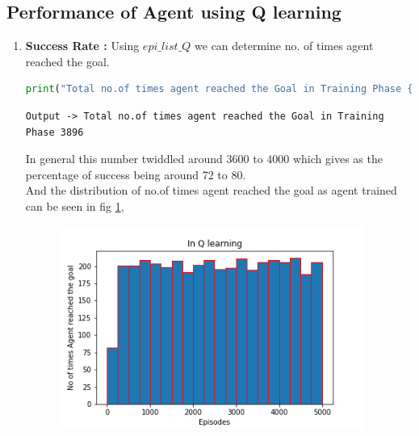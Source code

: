 \documentclass[journal,12pt,onecolumn]{IEEEtran}
\theoremstyle{remark}
\numberwithin{equation}{section}
\begin{document}
\subsection{Performance of Agent using Q learning}
 \begin{enumerate}
   \item \textbf{Success Rate :} Using $epi\_list\_Q$ we can determine no. of times agent reached the goal. 
 \begin{lstlisting}[language = Python]
print("Total no.of times agent reached the Goal in Training Phase {}".format(len(epi_list_Q)))
            \end{lstlisting}
            \begin{lstlisting}
Output -> Total no.of times agent reached the Goal in Training Phase 3896
            \end{lstlisting}
        In general this number twiddled around $3600$ to $4000$ which gives as the percentage of success being around 72 to 80.\\
	And the distribution of no.of times agent reached the goal as agent trained can be seen in fig \ref{epi-suc-Q},
	\begin{figure}[ht]
		      \centering
		      \includegraphics[width = 10cm]{Figs/hist_Q.png}
                      \caption{}
		      \label{epi-suc-Q}
	      \end{figure}


\end{enumerate}
\end{document}
